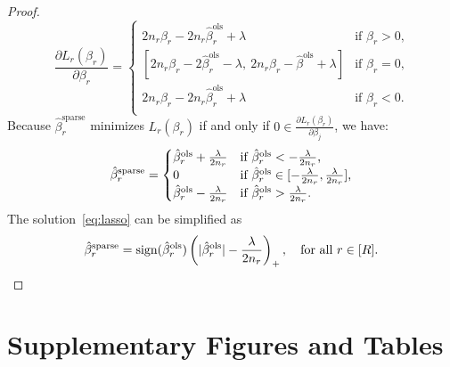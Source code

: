\documentclass{article}
\begin{document}
\begin{appendices}
\begin{proof}
\begin{equation}
\frac{\partial L_r(\beta_r)}{\partial \beta_r} = 
\begin{cases}
2n_r\beta_r-2n_r\hat \beta^{\text{ols}}_r+\lambda &\mbox{if $\beta_r>0$,}\\
 [2n_r\beta_r-2\hat \beta^{\text{ols}}_r-\lambda, \ 2n_r\beta_r-\hat \beta^{\text{ols}}+\lambda]&\mbox{if $\beta_r=0$,}\\
2n_r\beta_r-2n_r\hat \beta^{\text{ols}}_r+\lambda &\mbox{if $\beta_r<0$.}\\
\end{cases}
\end{equation}
Because $\hat \beta^{\text{sparse}}_r$ minimizes $L_r(\beta_r)$ if and only if $0 \in \frac{\partial L_r(\beta_r)}{\partial \beta_j}$, we have:
\begin{equation}\label{eq:lasso}
\hat \beta^{\text{sparse}}_r=
\begin{cases}
\hat \beta^{\text{ols}}_r+{\lambda\over 2n_r}&\mbox{if $\hat \beta^{\text{ols}}_r<-{\lambda \over 2n_r}$,}\\
0 &\mbox{if $\hat \beta^{\text{ols}}_r\in[-{\lambda \over 2n_r},{\lambda \over 2n_r}]$,}\\
\hat \beta^{\text{ols}}_r-{\lambda\over 2n_r}&\mbox{if $\hat \beta^{\text{ols}}_r>{\lambda \over 2n_r}$.}\\
\end{cases}
\end{equation}
The solution~\eqref{eq:lasso} can be simplified as 
\[
\hat \beta^{\text{sparse}}_r=\text{sign}(\hat \beta^{\text{ols}}_r)\left(|\hat \beta^{\text{ols}}_r|-{\lambda\over 2n_r}\right)_{+},\quad \text{for all $r\in[R]$}.
\]
\qedhere
\end{proof}

\section{Supplementary Figures and Tables}



\end{appendices}
\end{document}
